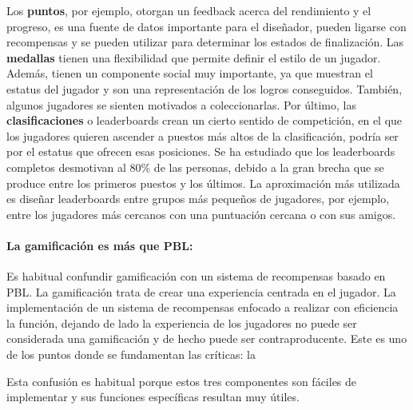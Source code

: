 Los \textbf{puntos}, por ejemplo, otorgan un feedback acerca del rendimiento y el progreso, es una fuente de datos importante para el diseñador, pueden ligarse con recompensas y se pueden utilizar para determinar los estados de finalización.
%
Las \textbf{medallas} tienen una flexibilidad que permite definir el estilo de un jugador. 
%
Además, tienen un componente social muy importante, ya que muestran el estatus del jugador y son una representación de los logros conseguidos. 
%
También, algunos jugadores se sienten motivados a coleccionarlas.
%
Por último, las \textbf{clasificaciones} o leaderboards crean un cierto sentido de competición, en el que los jugadores quieren ascender a puestos más altos de la clasificación, podría ser por el estatus que ofrecen esas posiciones.
%
Se ha estudiado que los leaderboards completos desmotivan al 80\% de las personas, debido a la gran brecha que se produce entre los primeros puestos y los últimos.
%
La aproximación más utilizada es diseñar leaderboards entre grupos más pequeños de jugadores, por ejemplo, entre los jugadores más cercanos con una puntuación cercana o con sus amigos.


\paragraph{La gamificación es más que \gls{PBL}:} Es habitual confundir gamificación con un sistema de recompensas basado en \gls{PBL}. 
%
La gamificación trata de crear una experiencia centrada en el jugador. 
%
La implementación de un sistema de recompensas enfocado a realizar con eficiencia la función, dejando de lado la experiencia de los jugadores no puede ser considerada una gamificación y de hecho puede ser contraproducente.
%
Este es uno de los puntos donde se fundamentan las críticas: la 
%

Esta confusión es habitual porque estos tres componentes son fáciles de implementar y sus funciones específicas resultan muy útiles.



